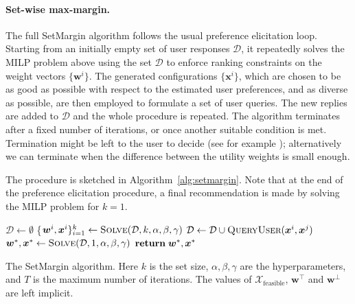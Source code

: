\documentclass{article}
\renewcommand\[{\begin{equation}}
\renewcommand\]{\end{equation}}
\newcommand{\calvar}[1]{\ensuremath{\mathcal{#1}}}
\newcommand{\calD}{\calvar{D}}
\newcommand{\calX}{\calvar{X}}
\newcommand{\vecvar}[1]{\ensuremath{\boldsymbol{#1}}}
\newcommand{\vw}{\vecvar{w}}
\newcommand{\vx}{\vecvar{x}}
\newcommand{\andrea}[1]{{\bf \textcolor{blue}{{\fbox{Andrea:} #1}}}}
\begin{document}
\paragraph{Set-wise max-margin.} The full {\sc SetMargin} algorithm
follows the usual preference elicitation loop. Starting from an
initially empty set of user responses $\calD$, it repeatedly solves
the MILP problem above using the set $\calD$ to enforce ranking
constraints on the weight vectors $\{\vw^i\}$. The generated
configurations $\{\vx^i\}$, which are chosen to be as good as possible
with respect to the estimated user preferences, and as diverse as
possible, are then employed to formulate a set of user queries. The
new replies are added to $\calD$ and the whole procedure is
repeated. The algorithm terminates after a fixed number of iterations,
or once another suitable condition is met. 
Termination might be left to the user to decide (see for example \cite{Reilly2007}); 
alternatively we can terminate when the difference between the utility weights is small enough.

The procedure is sketched in
Algorithm~\ref{alg:setmargin}. Note that at the end of the preference
elicitation procedure, a final recommendation is made by solving the
MILP problem for $k=1$.

\begin{algorithm}
{\footnotesize
\begin{algorithmic}[1]
        \State $\calD \gets \emptyset$
            \State \{$\vw^{i}, \vx^{i}\}_{i=1}^k \gets \text{{\sc Solve}}(\calD, k, \alpha, \beta, \gamma)$
            \For{$\vx^{i},\vx^{j} \in \{ \vx^{1}, \ldots, \vx^{k} \} \; \text{{\bf s.t.}} \; i < j$}
                \State $\calD \gets \calD \cup \text{{\sc QueryUser}}(\vx^{i},\vx^{j})$
            \EndFor
        \EndFor
        \State $\vw^*, \vx^* \gets \text{{\sc Solve}}(\calD, 1, \alpha, \beta, \gamma)$
        \State ${\bf return}\; \vw^*, \vx^*$
    \EndProcedure
\end{algorithmic}
}
\caption{\label{alg:setmargin} The {\sc SetMargin} algorithm. Here $k$ is the
set size, $\alpha,\beta,\gamma$ are the hyperparameters, and $T$ is the maximum
number of iterations. The values of $\calX_\text{feasible}$, $\vw^\top$ and
$\vw^\bot$ are left implicit.}
\end{algorithm}
\end{document}
